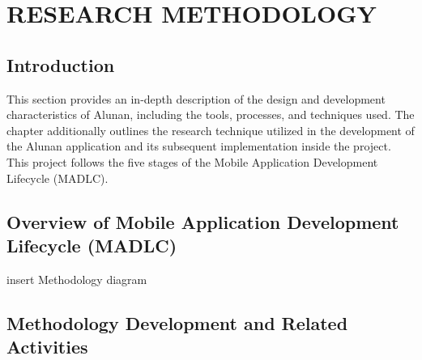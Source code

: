 \chapter{RESEARCH METHODOLOGY}
\label{ch:method}

\section{Introduction}
This section provides an in-depth description of the design and development characteristics of Alunan, including the tools, processes, and techniques used. The chapter additionally outlines the research technique utilized in the development of the Alunan application and its subsequent implementation inside the project. This project follows the five stages of the Mobile Application Development Lifecycle (MADLC).

\section{Overview of Mobile Application Development Lifecycle (MADLC)}
insert Methodology diagram

\section{Methodology Development and Related Activities}

